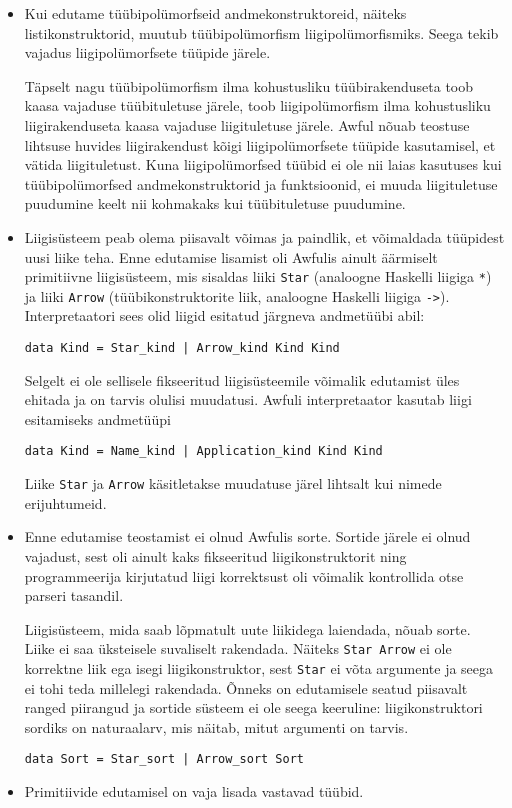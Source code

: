 \documentclass[12pt]{article}
\begin{document}
        \begin{itemize}
          \item
            Kui edutame tüübipolümorfseid andmekonstruktoreid, näiteks listikonstruktorid, muutub tüübipolümorfism liigipolümorfismiks. Seega tekib vajadus liigipolümorfsete tüüpide järele.

            Täpselt nagu tüübipolümorfism ilma kohustusliku tüübirakenduseta toob kaasa vajaduse tüübituletuse järele, toob liigipolümorfism ilma kohustusliku liigirakenduseta kaasa vajaduse liigituletuse järele. Awful nõuab teostuse lihtsuse huvides liigirakendust kõigi liigipolümorfsete tüüpide kasutamisel, et vätida liigituletust. Kuna liigipolümorfsed tüübid ei ole nii laias kasutuses kui tüübipolümorfsed andmekonstruktorid ja funktsioonid, ei muuda liigituletuse puudumine keelt nii kohmakaks kui tüübituletuse puudumine.
          \item
            Liigisüsteem peab olema piisavalt võimas ja paindlik, et võimaldada tüüpidest uusi liike teha. Enne edutamise lisamist oli Awfulis ainult äärmiselt primitiivne liigisüsteem, mis sisaldas liiki \verb!Star! (analoogne Haskelli liigiga \verb!*!) ja liiki \verb!Arrow! (tüübikonstruktorite liik, analoogne Haskelli liigiga \verb!->!). Interpretaatori sees olid liigid esitatud järgneva andmetüübi abil:

            \begin{verbatim}data Kind = Star_kind | Arrow_kind Kind Kind\end{verbatim}

            Selgelt ei ole sellisele fikseeritud liigisüsteemile võimalik edutamist üles ehitada ja on tarvis olulisi muudatusi. Awfuli interpretaator kasutab liigi esitamiseks andmetüüpi

            \begin{verbatim}data Kind = Name_kind | Application_kind Kind Kind\end{verbatim}

            Liike \verb!Star! ja \verb!Arrow! käsitletakse muudatuse järel lihtsalt kui nimede erijuhtumeid.
          \item
            Enne edutamise teostamist ei olnud Awfulis sorte. Sortide järele ei olnud vajadust, sest oli ainult kaks fikseeritud liigikonstruktorit ning programmeerija kirjutatud liigi korrektsust oli võimalik kontrollida otse parseri tasandil.

            Liigisüsteem, mida saab lõpmatult uute liikidega laiendada, nõuab sorte. Liike ei saa üksteisele suvaliselt rakendada. Näiteks \verb!Star Arrow! ei ole korrektne liik ega isegi liigikonstruktor, sest \verb!Star! ei võta argumente ja seega ei tohi teda millelegi rakendada. Õnneks on edutamisele seatud piisavalt ranged piirangud ja sortide süsteem ei ole seega keeruline: liigikonstruktori sordiks on naturaalarv, mis näitab, mitut argumenti on tarvis.

            \begin{verbatim}data Sort = Star_sort | Arrow_sort Sort\end{verbatim}
          \item
            Primitiivide edutamisel on vaja lisada vastavad tüübid.
        \end{itemize}
\end{document}
